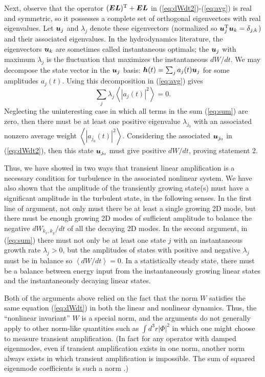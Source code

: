 \documentclass[12pt,superscriptaddress]{revtex4}
\newcommand{\vect}[1]{\mbox{\boldmath $#1$}}
\newcommand{\transpose}{\mathrm{T}}
\begin{document}
Next, observe that the operator $(\vect{E}\vect{L})^\transpose + \vect{E}\vect{L}$ in (\ref{eq:dWdt2})-(\ref{eq:avg})
is real and symmetric, so it possesses a complete set of orthogonal eigenvectors with real eigenvalues.
Let $\vect{u}_j$ and $\lambda_j$
denote these eigenvectors (normalized so $\vect{u}_j^\transpose \vect{u}_k = \delta_{j,k}$)
and their associated eigenvalues.
In the hydrodynamics literature, the eigenvectors $\vect{u}_k$ are sometimes called
instantaneous optimals; the $\vect{u}_j$ with maximum $\lambda_j$ is the fluctuation
that maximizes the instantaneous $dW/dt$.
We may decompose the state vector in the $\vect{u}_j$ basis:
$\vect{h}(t) = \sum_j a_j(t) \vect{u}_j$ for some amplitudes $a_j(t)$. 
Using this decomposition in (\ref{eq:avg}) gives
\begin{equation}
\label{eq:sum}
\sum_j \lambda_j \left< \left| a_j(t) \right|^2 \right>
=0.
\end{equation}
Neglecting the uninteresting case in which all terms in the sum (\ref{eq:sum}) are zero,
then there must be at least one positive eigenvalue $\lambda_{j_0}$ with an associated nonzero
average weight $\left< \left| a_{j_0}(t) \right|^2 \right>$. Considering the associated
$\vect{u}_{j_0}$ in (\ref{eq:dWdt2}), then this state $\vect{u}_{j_0}$ must give positive $dW/dt$,
proving statement 2.

Thus, we have showed in two ways that transient linear amplification is a necessary
condition for turbulence in the associated nonlinear system.  We have also shown that the amplitude of the
transiently growing state(s) must have a significant amplitude in the turbulent state, in the following senses.
In the first line of argument, not only must there be at least a single growing 2D mode,
but there must be enough growing 2D modes of sufficient amplitude to balance the negative $dW_{k_x,k_y}/dt$
of all the decaying 2D modes.
In the second argument, in (\ref{eq:sum})
there must not only be at least one state $j$ with an instantaneous growth rate
$\lambda_j >0$, but the amplitudes of states with positive and negative
$\lambda_j$ must be in balance so $\left< dW/dt \right>=0$. In a statistically steady state, there must be a balance between energy input from the instantaneously growing
linear states and the instantaneously decaying linear states.

Both of the arguments above relied on the fact that the norm $W$ satisfies the same equation
(\ref{eq:dWdt}) in both the linear and nonlinear dynamics.
Thus, the ``nonlinear invariant'' $W$ is a special norm, and the arguments do not generally apply to other norm-like quantities
such as $\int d^3r \left| \Phi \right|^2$ in which one might choose to measure transient amplification.
(In fact for any operator with damped eigenmodes,
even if transient amplification exists in one norm,
another norm always exists in which transient amplification is impossible.
The sum of squared eigenmode coefficients is such a norm \cite{FarrellIoannou1993}.)
\end{document}
